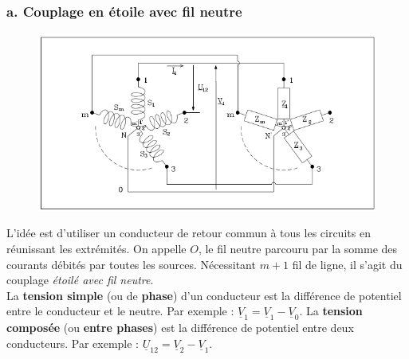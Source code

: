 \subsubsection{a. Couplage en étoile avec fil neutre}
\begin{figure}
	\vspace{-5mm}
	\includegraphics[scale=0.4]{ch1/image6.png}
\end{figure}
L'idée est d'utiliser un conducteur de retour commun à tous les circuits 
en réunissant les extrémités. On appelle $O$, le fil neutre parcouru par 
la somme des courants débités par toutes les sources. Nécessitant $m+1$ 
fil de ligne, il s'agit du couplage \textit{étoilé avec fil neutre}.\\
		
La \textbf{tension simple} (ou de \textbf{phase}) d'un conducteur est 
la différence de potentiel entre le conducteur et le neutre. Par 
exemple : $\underline{V}_1 = \underline{V}_1-\underline{V}_0$. La 
\textbf{tension composée} (ou \textbf{entre phases}) est la différence 
de potentiel entre deux conducteurs. Par exemple : $\underline{U}_{12} = 
\underline{V}_2-\underline{V}_1$.
		
		
